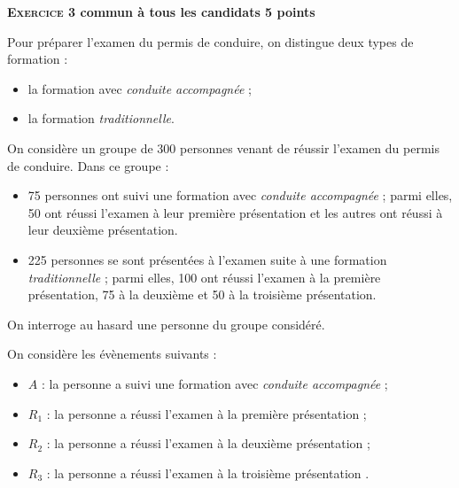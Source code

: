 \textbf{\large\textsc{Exercice 3} \hfill  commun à tous les candidats \hfill 5 points}  

\medskip

Pour préparer l'examen du permis de conduire, on distingue deux types de formation :

\begin{itemize}
\item la formation avec \emph{conduite accompagnée} ;
\item la formation \emph{traditionnelle}.
\end{itemize}

On considère un groupe de 300 personnes venant de réussir l'examen du permis de conduire. Dans ce groupe :

\begin{itemize}
\item 75 personnes ont suivi une formation avec \emph{conduite accompagnée} ; parmi elles, 50 ont réussi l'examen à leur première présentation et les autres ont réussi à leur deuxième présentation.
\item  225 personnes se sont présentées à l'examen suite à une formation \emph{traditionnelle} ; parmi elles, 100 ont réussi l'examen à la première présentation, 75 à la deuxième et 50 à la troisième présentation.
\end{itemize}

On interroge au hasard une personne du groupe considéré.

On considère les évènements suivants :
\begin{itemize}
\item [] $A$ : \og la personne a suivi une formation avec \emph{conduite accompagnée} \fg{} ;
\item [] $R_1$ : \og la personne a réussi l'examen à la première présentation \fg{} ;
\item []$R_2$ : \og la personne a réussi l'examen à la deuxième présentation \fg{} ;
\item []$R_3$ : \og la personne a réussi l'examen à la troisième présentation \fg.
\end{itemize}

\medskip

